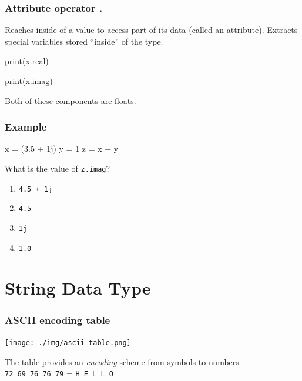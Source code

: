 \documentclass[11pt]{beamer}
\begin{document}
\begin{frame}
  \frametitle{Attribute operator \textbf{.}}
  \Enlarge

  \begin{itemize}
  \myitem  Reaches inside of a value to access part of its data (called an attribute). \pause
  \myitem  Extracts special variables stored ``inside'' of the type.
    \begin{semiverbatim}
print(x.real)

print(x.imag)
    \end{semiverbatim} \pause
  \myitem  Both of these components are floats.
  \end{itemize}
\end{frame}

\begin{frame}[fragile]
  \frametitle{Example}
  \Enlarge

  \begin{semiverbatim}
x = (3.5 + 1j)
y = 1
z = x + y
  \end{semiverbatim}
  What is the value of \texttt{z.imag}? \pause
  \begin{enumerate}[label=\Alph*]
  \item  \texttt{4.5 + 1j}
  \item  \texttt{4.5}
  \item  \texttt{1j}
  \item  \texttt{1.0}
  \end{enumerate}
\end{frame}

\fi
\section{String Data Type}


\begin{frame}
  \frametitle{ASCII encoding table}
  \Enlarge
  \texttt{[image: ./img/ascii-table.png]} \\ \pause
  
  {\small The table provides an \emph{encoding} scheme from symbols to numbers} \\
  \texttt{72 69 76 76 79} = \texttt{H E L L O} %
  
\end{frame}
\end{document}
